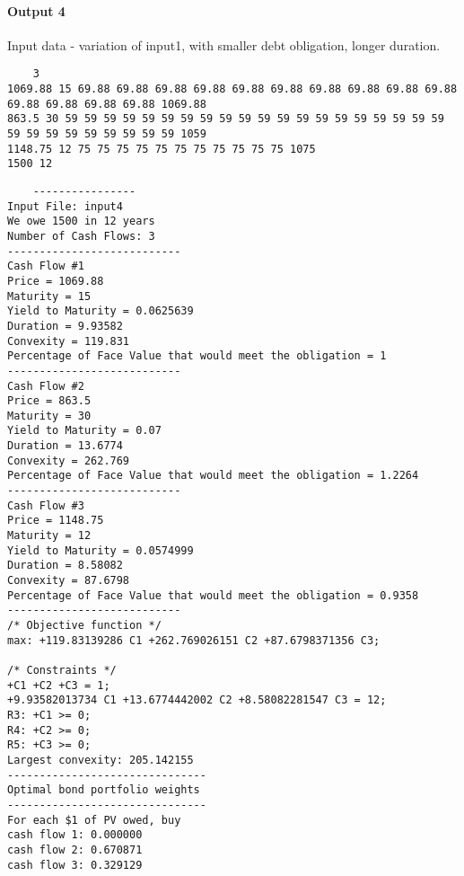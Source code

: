 \documentclass[12pt]{article}
\begin{document}
\paragraph{Output 4}
Input data - variation of input1, with smaller debt obligation, longer duration.
\begin{verbatim}
    3
1069.88 15 69.88 69.88 69.88 69.88 69.88 69.88 69.88 69.88 69.88 69.88 69.88 69.88 69.88 69.88 1069.88
863.5 30 59 59 59 59 59 59 59 59 59 59 59 59 59 59 59 59 59 59 59 59 59 59 59 59 59 59 59 59 59 1059
1148.75 12 75 75 75 75 75 75 75 75 75 75 75 1075
1500 12
\end{verbatim}
\begin{verbatim}
    ----------------
Input File: input4
We owe 1500 in 12 years
Number of Cash Flows: 3
---------------------------
Cash Flow #1
Price = 1069.88
Maturity = 15
Yield to Maturity = 0.0625639
Duration = 9.93582
Convexity = 119.831
Percentage of Face Value that would meet the obligation = 1
---------------------------
Cash Flow #2
Price = 863.5
Maturity = 30
Yield to Maturity = 0.07
Duration = 13.6774
Convexity = 262.769
Percentage of Face Value that would meet the obligation = 1.2264
---------------------------
Cash Flow #3
Price = 1148.75
Maturity = 12
Yield to Maturity = 0.0574999
Duration = 8.58082
Convexity = 87.6798
Percentage of Face Value that would meet the obligation = 0.9358
---------------------------
/* Objective function */
max: +119.83139286 C1 +262.769026151 C2 +87.6798371356 C3;

/* Constraints */
+C1 +C2 +C3 = 1;
+9.93582013734 C1 +13.6774442002 C2 +8.58082281547 C3 = 12;
R3: +C1 >= 0;
R4: +C2 >= 0;
R5: +C3 >= 0;
Largest convexity: 205.142155
-------------------------------
Optimal bond portfolio weights
-------------------------------
For each $1 of PV owed, buy
cash flow 1: 0.000000
cash flow 2: 0.670871
cash flow 3: 0.329129
\end{verbatim}
\end{document}
